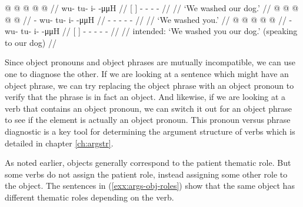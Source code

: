 \pex\label{exx:args-obj-notboth}%
\a\label{ex:args-obj-notboth-phrase}%
%
\begingl
	\gla	{}   @ {} {}  @ {} @ {} @ {} @ {} //
	\glb	{}    {} wu- tu- i-  -μμH //
	\glc	{}[    {}]
			- - -  - //
	\gld	{}   {} {}  {} {} {} {} //
	\glft	‘We washed our dog.’
		//
\endgl
\a\label{ex:args-obj-notboth-pron}%
%
\begingl
	\gla	{} @ {} @ {} @ {} @ {} @ {} //
	\glb	{}- wu- tu- i-  -μμH //
	\glc	{}- - - -  - //
	\gld	{} {} {} {} {} {} //
	\glft	‘We washed you.’
		//
\endgl
\a\label{ex:args-obj-notboth-both}%
\ljudge{*}%
%
\begingl
	\gla	{}   @ {} {}  @ {} @ {} @ {} @ {} //
	\glb	{}    {} - wu- tu- i-  -μμH //
	\glc	{}[    {}]
			- - - -  - //
	\gld	{}   {} {}  {} {} {} {} //
	\glft	intended: ‘We washed you our dog.’ (speaking to our dog)
		//
\endgl
\xe

Since object pronouns and object phrases are mutually incompatible, we can use one to diagnose the other. If we are looking at a sentence which might have an object phrase, we can try replacing the object phrase with an object pronoun to verify that the phrase is in fact an object. And likewise, if we are looking at a verb that contains an object pronoun, we can switch it out for an object phrase to see if the element is actually an object pronoun. This pronoun versus phrase diagnostic is a key tool for determining the argument structure of verbs which is detailed in chapter \ref{ch:argstr}.

As noted earlier, objects generally correspond to the patient thematic role. But some verbs do not assign the patient role, instead assigning some other role to the object. The sentences in (\ref{exx:args-obj-roles}) show that the same object has different thematic roles depending on the verb.

